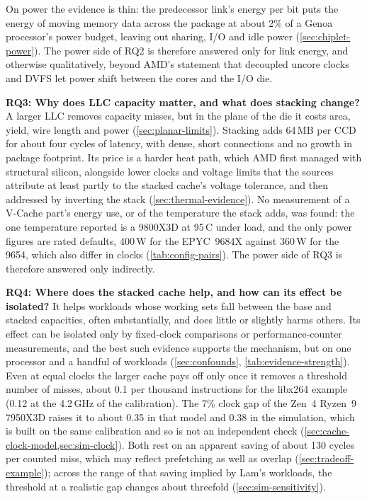On power the evidence is thin: the predecessor link's energy per bit puts the energy of moving memory data across the package at about 2\% of a Genoa processor's power budget, leaving out sharing, I/O and idle power (\cref{sec:chiplet-power}). The power side of RQ2 is therefore answered only for link energy, and otherwise qualitatively, beyond AMD's statement that decoupled uncore clocks and DVFS let power shift between the cores and the I/O die.

\textbf{RQ3: Why does LLC capacity matter, and what does stacking change?} A larger LLC removes capacity misses, but in the plane of the die it costs area, yield, wire length and power (\cref{sec:planar-limits}). Stacking adds 64\,MB per CCD for about four cycles of latency, with dense, short connections and no growth in package footprint. Its price is a harder heat path, which AMD first managed with structural silicon, alongside lower clocks and voltage limits that the sources attribute at least partly to the stacked cache's voltage tolerance, and then addressed by inverting the stack (\cref{sec:thermal-evidence}). No measurement of a V-Cache part's energy use, or of the temperature the stack adds, was found: the one temperature reported is a 9800X3D at 95\,\textdegree C under load, and the only power figures are rated defaults, 400\,W for the EPYC~9684X against 360\,W for the 9654, which also differ in clocks (\cref{tab:config-pairs}). The power side of RQ3 is therefore answered only indirectly.

\textbf{RQ4: Where does the stacked cache help, and how can its effect be isolated?} It helps workloads whose working sets fall between the base and stacked capacities, often substantially, and does little or slightly harms others. Its effect can be isolated only by fixed-clock comparisons or performance-counter measurements, and the best such evidence supports the mechanism, but on one processor and a handful of workloads (\cref{sec:confounds}, \cref{tab:evidence-strength}). Even at equal clocks the larger cache pays off only once it removes a threshold number of misses, about 0.1 per thousand instructions for the libx264 example (0.12 at the 4.2\,GHz of the calibration). The 7\% clock gap of the Zen~4 Ryzen~9 7950X3D raises it to about 0.35 in that model and 0.38 in the simulation, which is built on the same calibration and so is not an independent check (\cref{sec:cache-clock-model,sec:sim-clock}). Both rest on an apparent saving of about 130 cycles per counted miss, which may reflect prefetching as well as overlap (\cref{sec:tradeoff-example}); across the range of that saving implied by Lam's workloads, the threshold at a realistic gap changes about threefold (\cref{sec:sim-sensitivity}).


